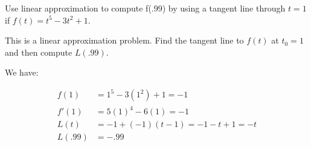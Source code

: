 \documentclass{ximera}
\author{Emma Smith Zbarsky}
\begin{document}
\begin{exercise}

Use linear approximation to compute f(.99) by using a tangent line
through $t=1$ if $f(t) = t^5-3t^2+1$.


\begin{hint}
This is a linear approximation problem. Find the tangent line to $f(t)$
at $t_0=1$ and then compute $L(.99)$.
\end{hint}


\begin{hint}
We have:

\begin{align*}
f(1) &= 1^5-3(1^2)+1 = -1 \\
f'(1) &= 5(1)^4-6(1) = -1 \\
L(t) &= -1+(-1)(t-1) = -1-t+1 = -t \\
L(.99) &= -.99
\end{align*}
\end{hint}


\begin{multipleChoice}
\end{multipleChoice}

\end{exercise}
\end{document}
